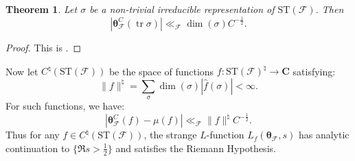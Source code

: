 \documentclass{article}
\DeclareMathOperator{\tr}{tr}
\newcommand{\bC}{\mathbf{C}}
\newcommand{\btheta}{{\boldsymbol{\theta}}}
\newcommand{\cF}{\mathcal{F}}
\newcommand{\ST}{\mathrm{ST}}
\newtheorem{theorem}[subsection]{Theorem}
\theoremstyle{definition}
\begin{document}
\begin{theorem}
Let $\sigma$ be a non-trivial irreducible representation of $\ST(\cF)$. Then 
\[
	|\btheta^C_\cF(\tr\sigma)| \ll_\cF \dim(\sigma) C^{-\frac 1 2} .
\]
\end{theorem}
\begin{proof}
This is \cite[p.39]{katz-1988}.
\end{proof}

Now let $C^\natural(\ST(\cF))$ be the space of functions 
$f\colon \ST(\cF)^\natural\to \bC$ satisfying:
\[
	\|f\|^\natural = \sum_\sigma \dim(\sigma)|\widehat f(\sigma)| < \infty .
\]
For such functions, we have:
\[
	|\btheta_\cF^C(f) - \mu(f)| \ll_\cF \|f\|^\natural C^{-\frac 1 2} .
\]
Thus for any $f\in C^\natural(\ST(\cF))$, the strange $L$-function 
$L_f(\btheta_\cF,s)$ has analytic continuation to $\{\Re s>\frac 1 2\}$ and 
satisfies the Riemann Hypothesis.
\end{document}
